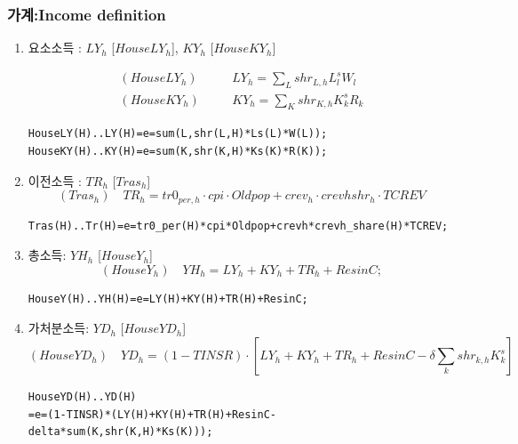 \documentclass[10pt,compress,slidetop,%
			   hyperref={unicode},xcolor={svgnames},%
			   t]{beamer}
\begin{document}
\begin{frame}[fragile]
\frametitle{가계:Income definition}
\begin{scriptsize}
\begin{enumerate}
\item{요소소득 : $LY_h$ [$HouseLY_h$], $KY_h$ [$HouseKY_h$]}

\begin{eqnarray*}
(HouseLY_h)&\quad& LY_h=\sum_L shr_{L,h}L^s_lW_l\\
(HouseKY_h)&\quad& KY_h=\sum_K shr_{K,h}K^s_kR_k
\end{eqnarray*}
\begin{verbatim}
HouseLY(H)..LY(H)=e=sum(L,shr(L,H)*Ls(L)*W(L));
HouseKY(H)..KY(H)=e=sum(K,shr(K,H)*Ks(K)*R(K));
\end{verbatim}

\item{이전소득 : $TR_h$ [$Tras_h$]}
\begin{displaymath}
(Tras_h)\quad TR_h=tr0_{per,h}\cdot cpi\cdot Oldpop +crev_h\cdot crevhshr_h\cdot TCREV
\end{displaymath}
\begin{verbatim}
Tras(H)..Tr(H)=e=tr0_per(H)*cpi*Oldpop+crevh*crevh_share(H)*TCREV;
\end{verbatim}

\item{총소득: $YH_h$ [$HouseY_h$]}
\begin{displaymath}
(HouseY_h)\quad YH_h=LY_h+KY_h+TR_h+ResinC;
\end{displaymath}
\begin{verbatim}
HouseY(H)..YH(H)=e=LY(H)+KY(H)+TR(H)+ResinC;
\end{verbatim}


\item{가처분소득: $YD_h$ [$HouseYD_h$]}
\begin{displaymath}
(HouseYD_h)\quad YD_h=(1-TINSR)\cdot\left[LY_h+KY_h+TR_h+ResinC-\delta\sum_k shr_{k,h}K^s_k\right]
\end{displaymath}
\begin{verbatim}  
HouseYD(H)..YD(H)
=e=(1-TINSR)*(LY(H)+KY(H)+TR(H)+ResinC-delta*sum(K,shr(K,H)*Ks(K)));
\end{verbatim}
\end{enumerate}
\end{scriptsize}
\end{frame}
\end{document}
